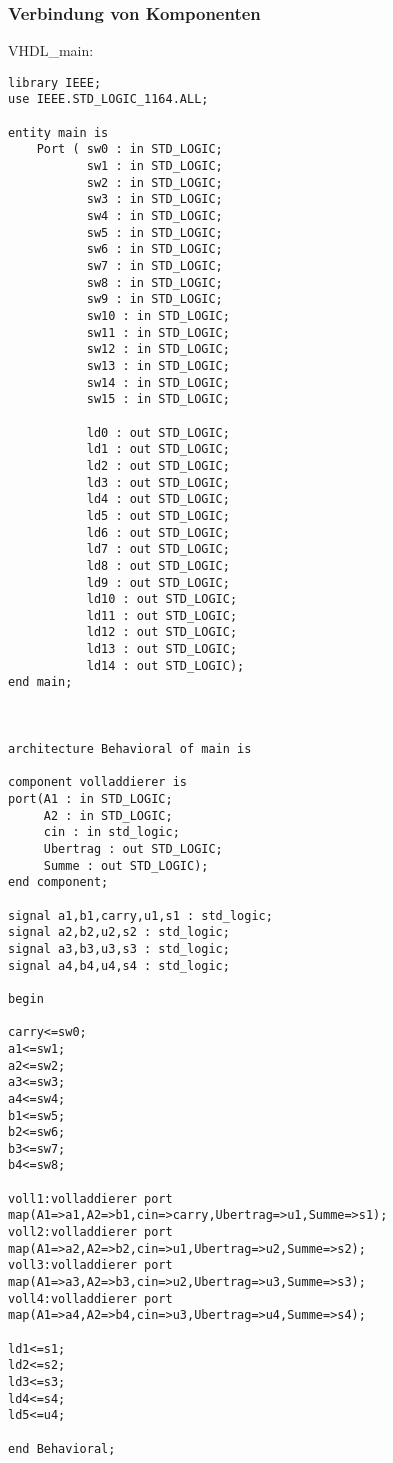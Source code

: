 \documentclass{article}
\begin{document}
\subsubsection{Verbindung von Komponenten}
VHDL\_main:\newline
\begin{verbatim}
library IEEE;
use IEEE.STD_LOGIC_1164.ALL;

entity main is
    Port ( sw0 : in STD_LOGIC;
           sw1 : in STD_LOGIC;
           sw2 : in STD_LOGIC;
           sw3 : in STD_LOGIC;
           sw4 : in STD_LOGIC;
           sw5 : in STD_LOGIC;
           sw6 : in STD_LOGIC;
           sw7 : in STD_LOGIC;
           sw8 : in STD_LOGIC;
           sw9 : in STD_LOGIC;
           sw10 : in STD_LOGIC;
           sw11 : in STD_LOGIC;
           sw12 : in STD_LOGIC;
           sw13 : in STD_LOGIC;
           sw14 : in STD_LOGIC;
           sw15 : in STD_LOGIC;
           
           ld0 : out STD_LOGIC;
           ld1 : out STD_LOGIC;
           ld2 : out STD_LOGIC;
           ld3 : out STD_LOGIC;
           ld4 : out STD_LOGIC;
           ld5 : out STD_LOGIC;
           ld6 : out STD_LOGIC;
           ld7 : out STD_LOGIC;
           ld8 : out STD_LOGIC;
           ld9 : out STD_LOGIC;
           ld10 : out STD_LOGIC;
           ld11 : out STD_LOGIC;
           ld12 : out STD_LOGIC;
           ld13 : out STD_LOGIC;
           ld14 : out STD_LOGIC);
end main;



architecture Behavioral of main is

component volladdierer is
port(A1 : in STD_LOGIC;
     A2 : in STD_LOGIC;
     cin : in std_logic;
     Ubertrag : out STD_LOGIC;
     Summe : out STD_LOGIC);
end component;

signal a1,b1,carry,u1,s1 : std_logic;
signal a2,b2,u2,s2 : std_logic;
signal a3,b3,u3,s3 : std_logic;
signal a4,b4,u4,s4 : std_logic;

begin

carry<=sw0;
a1<=sw1;
a2<=sw2;
a3<=sw3;
a4<=sw4;
b1<=sw5;
b2<=sw6;
b3<=sw7;
b4<=sw8;

voll1:volladdierer port map(A1=>a1,A2=>b1,cin=>carry,Ubertrag=>u1,Summe=>s1);
voll2:volladdierer port map(A1=>a2,A2=>b2,cin=>u1,Ubertrag=>u2,Summe=>s2);
voll3:volladdierer port map(A1=>a3,A2=>b3,cin=>u2,Ubertrag=>u3,Summe=>s3);
voll4:volladdierer port map(A1=>a4,A2=>b4,cin=>u3,Ubertrag=>u4,Summe=>s4);

ld1<=s1;
ld2<=s2;
ld3<=s3;
ld4<=s4;
ld5<=u4;

end Behavioral;
\end{verbatim}
\end{document}
